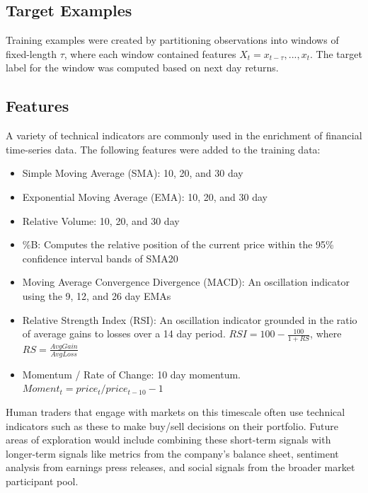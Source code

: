 \documentclass[10pt,twocolumn,letterpaper]{article}
\begin{document}
    \subsection{Target Examples}
    Training examples were created by partitioning observations into windows of fixed-length $\tau$, where each window contained features $X_t = x_{t - \tau},..., x_t$. The target label for the window was computed based on next day returns.

    \subsection{Features}
A variety of technical indicators are commonly used in the enrichment of financial time-series data\cite{zou_survey,stock_charts}. The following features were added to the training data: 
    \begin{itemize}
        \item{Simple Moving Average (SMA): 10, 20, and 30 day}
        \item{Exponential Moving Average (EMA): 10, 20, and 30 day}
        \item{Relative Volume: 10, 20, and 30 day}
        \item{\%B: Computes the relative position of the current price within the 95\% confidence interval bands of SMA20}
        \item{Moving Average Convergence Divergence (MACD): An oscillation indicator using the 9, 12, and 26 day EMAs}
        \item{Relative Strength Index (RSI): An oscillation indicator grounded in the ratio of average gains to losses over a 14 day period. $RSI = 100 - \frac{100}{1 + RS}$, where $RS = \frac{AvgGain}{AvgLoss}$}
        \item{Momentum / Rate of Change: 10 day momentum. $Moment_t = price_t / price_{t-10} - 1$}
    \end{itemize}

Human traders that engage with markets on this timescale often use technical indicators such as these to make buy/sell decisions on their portfolio\cite{stock_charts}. Future areas of exploration would include combining these short-term signals with longer-term signals like metrics from the company’s balance sheet, sentiment analysis from earnings press releases, and social signals from the broader market participant pool.
\end{document}
